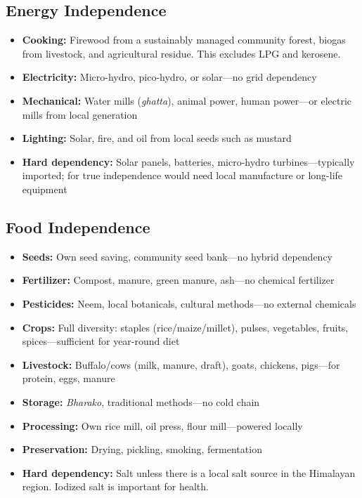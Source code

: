 \documentclass[11pt,a4paper]{article}
\begin{document}
\subsection{Energy Independence}
\begin{itemize}
    \item \textbf{Cooking:} Firewood from a sustainably managed community forest, biogas from livestock, and agricultural residue. This excludes LPG and kerosene.
    \item \textbf{Electricity:} Micro-hydro, pico-hydro, or solar---no grid dependency
    \item \textbf{Mechanical:} Water mills (\textit{ghatta}), animal power, human power---or electric mills from local generation
    \item \textbf{Lighting:} Solar, fire, and oil from local seeds such as mustard
    \item \textbf{Hard dependency:} Solar panels, batteries, micro-hydro turbines---typically imported; for true independence would need local manufacture or long-life equipment
\end{itemize}

\subsection{Food Independence}
\begin{itemize}
    \item \textbf{Seeds:} Own seed saving, community seed bank---no hybrid dependency
    \item \textbf{Fertilizer:} Compost, manure, green manure, ash---no chemical fertilizer
    \item \textbf{Pesticides:} Neem, local botanicals, cultural methods---no external chemicals
    \item \textbf{Crops:} Full diversity: staples (rice/maize/millet), pulses, vegetables, fruits, spices---sufficient for year-round diet
    \item \textbf{Livestock:} Buffalo/cows (milk, manure, draft), goats, chickens, pigs---for protein, eggs, manure
    \item \textbf{Storage:} \textit{Bharako}, traditional methods---no cold chain
    \item \textbf{Processing:} Own rice mill, oil press, flour mill---powered locally
    \item \textbf{Preservation:} Drying, pickling, smoking, fermentation
    \item \textbf{Hard dependency:} Salt unless there is a local salt source in the Himalayan region. Iodized salt is important for health.
\end{itemize}
\end{document}
